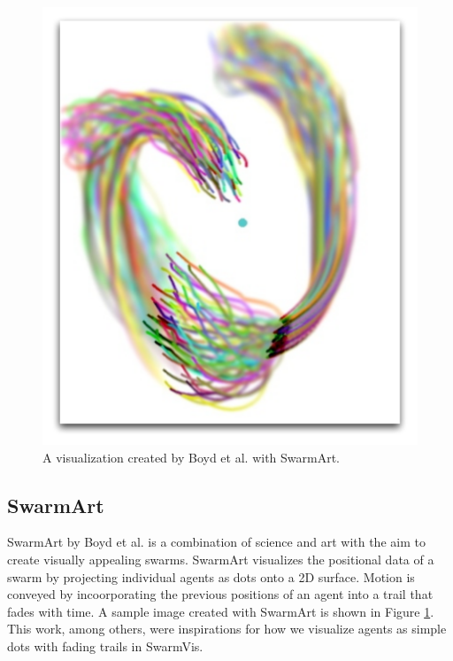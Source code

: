 \documentclass[conference]{IEEEtran}
\begin{document}
\begin{figure}
\centering
\includegraphics[scale=.3]{images/SwarmArt.pdf}
\caption{A visualization created by Boyd et al. with SwarmArt\cite{Boyd}.}
\label{SwarmArt}
\end{figure}

\subsection{SwarmArt}
SwarmArt\cite{Boyd} by Boyd et al. is a combination of science and art with the aim to create visually appealing swarms.
SwarmArt visualizes the positional data of a swarm by projecting individual agents as dots onto a 2D surface.
Motion is conveyed by incoorporating the previous positions of an agent into a trail that fades with time.
A sample image created with SwarmArt is shown in Figure \ref{SwarmArt}.
This work, among others\cite{codeswarm:website}, were inspirations for how we visualize agents as simple dots with fading trails
in SwarmVis.
\end{document}
